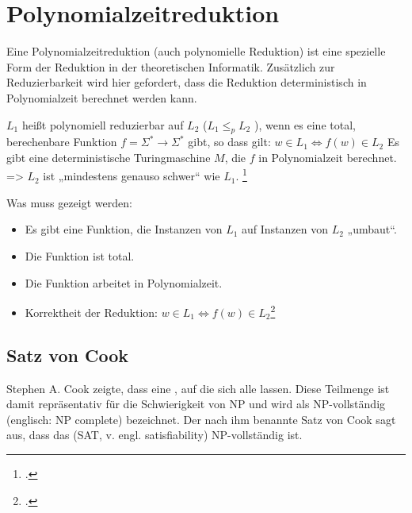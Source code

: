 \documentclass{lehramt-informatik-haupt}
\begin{document}
\section {Polynomialzeitreduktion}

Eine Polynomialzeitreduktion (auch polynomielle Reduktion) ist eine
spezielle Form der Reduktion in der theoretischen Informatik.
Zusätzlich zur Reduzierbarkeit wird hier gefordert, dass die
Reduktion deterministisch in Polynomialzeit berechnet werden kann.

$L_1$ heißt polynomiell reduzierbar auf $L_2$ ($L_1 \leq_p L_2$ ), wenn es
eine total, berechenbare Funktion $f = \Sigma^* \rightarrow \Sigma^*$
gibt, so dass gilt:
$w \in L_1 \Leftrightarrow f(w) \in L_2$
Es gibt
eine deterministische Turingmaschine $M$, die $f$ in Polynomialzeit
berechnet. => $L_2$ ist „mindestens genauso schwer“ wie $L_1$.
\footcite[Seite 64]{theo:fs:4}

Was muss gezeigt werden:

\begin{itemize}
\item Es gibt eine Funktion, die Instanzen von $L_1$ auf Instanzen von
$L_2$ „umbaut“.

\item Die Funktion ist total.

\item Die Funktion arbeitet in Polynomialzeit.

\item Korrektheit der Reduktion: $w \in L_1 \Leftrightarrow f(w) \in
L_2$\footcite[Seite 65]{theo:fs:4}
\end{itemize}


%


\subsection{Satz von Cook}

Stephen A. Cook zeigte, dass eine , auf die sich alle  lassen.
Diese Teilmenge ist damit repräsentativ für die Schwierigkeit von NP und
wird als NP-vollständig (englisch: NP complete) bezeichnet. Der nach ihm
benannte Satz von Cook sagt aus, dass das  (SAT, v. engl. satisfiability) NP-vollständig ist.
\end{document}
